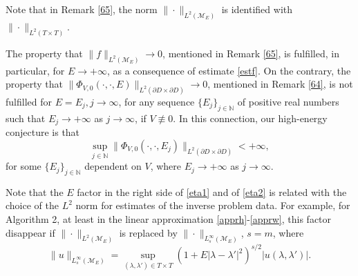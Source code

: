 \documentclass[11pt,a4paper,english,subeqn]{amsart}
\theoremstyle{plain}
\theoremstyle{definition}
\numberwithin{equation}{section}
\begin{document}
Note that in Remark \ref{65}, the norm $\| \cdot \|_{L^2({\mathscr{M}_E})}$ is identified with $\| \cdot \|_{L^2(T \times T)}$.

The property that $\|f\|_{L^2({\mathscr{M}_E})} \to 0$, mentioned in Remark \ref{65}, is fulfilled, in particular, for $E \to + \infty$, as a consequence of estimate \eqref{estf}. On the contrary, the property that $\| \Phi_{V,0}(\cdot, \cdot, E)\|_{L^2(\partial D \times \partial D)} \to 0$, mentioned in Remark \ref{64}, is not fulfilled for $E=E_j, j \to \infty$, for any sequence $\{ E_j \}_{j \in {\mathbb{N}}}$ of positive real numbers such that $E_j \to +\infty$ as $j \to \infty$, if $V \not \equiv 0$. In this connection, our high-energy conjecture is that 
\begin{equation}
\sup_{j \in {\mathbb{N}}} \| \Phi_{V,0}(\cdot, \cdot, E_j)\|_{L^2(\partial D \times \partial D)} < +\infty,
\end{equation}
for some $\{ E_j \}_{j \in {\mathbb{N}}}$ dependent on $V$, where $E_j \to +\infty$ as $j \to \infty$.

Note that the $E$ factor in the right side of \eqref{eta1} and of \eqref{eta2} is related with the choice of the $L^2$ norm for estimates of the inverse problem data. 
For example, for Algorithm 2, at least in the linear approximation \eqref{apprh}-\eqref{apprw}, this factor disappear if $\| \cdot \|_{L^2({\mathscr{M}_E})}$ is replaced by $\| \cdot \|_{L^{\infty}_s({\mathscr{M}_E})}$, $s =m$, where
\begin{equation}
\|u \|_{L^{\infty}_s({\mathscr{M}_E})} = \sup_{(\lambda, \lambda') \in T \times T} (1+E|\lambda - \lambda'|^2)^{s/2} |u(\lambda, \lambda')|.
\end{equation}
\end{document}
